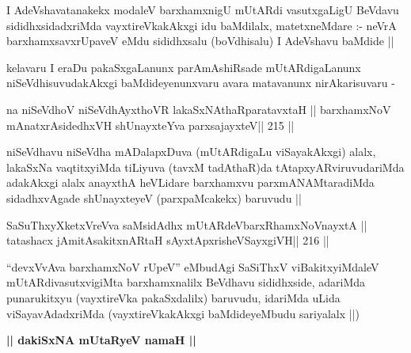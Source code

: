 \begin{artha}
I AdeVshavatanakekx modaleV barxhamxnigU mUtARdi vasutxgaLigU BeVdavu
sididhxsidadxriMda vayxtireVkakAkxgi idu baMdilalx, matetxneMdare :-
neVrA barxhamxsavxrUpaveV eMdu sididhxsalu (boVdhisalu) I AdeVshavu
baMdide ||
\end{artha}

\begin{artha}
kelavaru I eraDu pakaSxgaLanunx parAmAshiRsade mUtARdigaLanunx
niSeVdhisuvudakAkxgi baMdideyenunxvaru avara matavanunx nirAkarisuvaru -
\end{artha}

\begin{shl}
na niSeVdhoV niSeVdhAyxthoVR lakaSxNAthaRparatavxtaH ||
barxhamxNoV mAnatxrAsidedhxVH shUnayxteYva parxsajayxteV\hfill || 215 ||
\end{shl}

\begin{artha}
niSeVdhavu niSeVdha mADalapxDuva (mUtARdigaLu viSayakAkxgi) alalx,
lakaSxNa vaqtitxyiMda tiLiyuva (tavxM tadAthaR)da
tAtapxyARviruvudariMda adakAkxgi alalx anayxthA heVLidare barxhamxvu
parxmANAMtaradiMda sidadhxvAgade shUnayxteyeV (parxpaMcakekx) baruvudu ||
\end{artha}

\begin{shl}
SaSuThxyXketxVreVva saMsidAdhx mUtARdeVbarxRhamxNoV\s nayxtA ||
tatashacx jAmitAsakitxnARtaH sAyxtApxrisheVSayxgiVH\hfill || 216 ||
\end{shl}

\begin{artha}
``devxVvAva barxhamxNoV rUpeV'' eMbudAgi SaSiThxV viBakitxyiMdaleV
  mUtARdivasutxvigiMta barxhamxnalilx BeVdhavu sididhxside, adariMda
  punarukitxyu (vayxtireVka pakaSxdalilx) baruvudu, idariMda uLida
  viSayavAdadxriMda (vayxtireVkakAkxgi baMdideyeMbudu sariyalalx ||) 
\end{artha}

\begin{center}
\textbf{|| dakiSxNA mUtaRyeV namaH ||}
\end{center}
